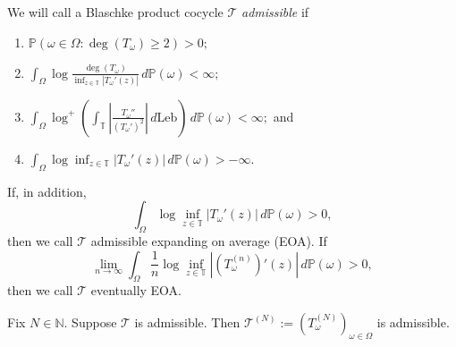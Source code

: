 \documentclass[10pt,a4paper]{amsart}
\begin{document}
\begin{definition}\label{admissible}
    We will call a Blaschke product cocycle $\mathcal{T}$ \textit{admissible} if \begin{enumerate}
    \item $\mathbb{P}(\omega\in\Omega:\deg(T_{\omega})\ge2)>0;$
    \item $\int_{\Omega}\log\frac{\deg(T_{\omega})}{\inf_{z\in\mathbb{T}}|T_{\omega}'(z)|}\,d\mathbb{P}(\omega)<\infty;$
    \item $\int_{\Omega}\log^{+}\left(\int_{\mathbb{T}}\left|\frac{T_{\omega}''}{(T_{\omega}')^2}\right|\,d\text{Leb}\right)\,d\mathbb{P}(\omega)<\infty;$ and
    \item $\int_{\Omega}\log\inf_{z\in\mathbb{T}}|T_{\omega}'(z)|\,d\mathbb{P}(\omega)>-\infty.$
    \end{enumerate} If, in addition, $$\int_{\Omega}\log\inf_{z\in\mathbb{T}}|T_{\omega}'(z)|\,d\mathbb{P}(\omega)>0,$$ then we call $\mathcal{T}$ admissible expanding on average (EOA). If $$\lim_{n\to\infty}\int_{\Omega}\frac{1}{n}\log\inf_{z\in\mathbb{T}}|(T_{\omega}^{(n)})'(z)|\,d\mathbb{P}(\omega)>0,$$ then we call $\mathcal{T}$ eventually EOA.
\end{definition}

\begin{lemma}
    Fix $N\in\mathbb{N}.$ Suppose $\mathcal{T}$ is admissible. Then $\mathcal{T}^{(N)}:=(T_{\omega}^{(N)})_{\omega\in\Omega}$ is admissible.
\end{lemma}
\end{document}
